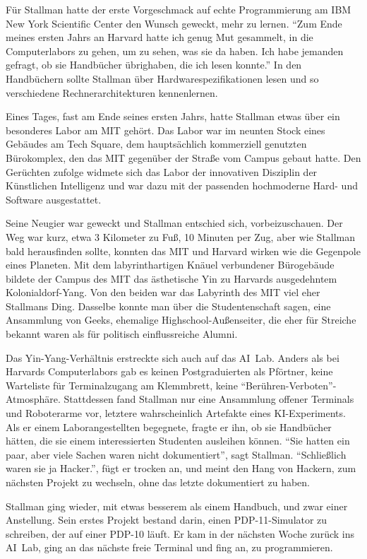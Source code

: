 Für Stallman hatte der erste Vorgeschmack auf echte Programmierung am IBM New York Scientific Center den Wunsch geweckt, mehr zu lernen. "`Zum Ende meines ersten Jahrs an Harvard hatte ich genug Mut gesammelt, in die Computerlabors zu gehen, um zu sehen, was sie da haben. Ich habe jemanden gefragt, ob sie Handbücher übrighaben, die ich lesen konnte."' In den Handbüchern sollte Stallman über Hardwarespezifikationen lesen und so verschiedene Rechnerarchitekturen kennenlernen.

Eines Tages, fast am Ende seines ersten Jahrs, hatte Stallman etwas über ein besonderes Labor am MIT gehört. Das Labor war im neunten Stock eines Gebäudes am Tech Square, dem hauptsächlich kommerziell genutzten Bürokomplex, den das MIT gegenüber der Straße vom Campus gebaut hatte. Den Gerüchten zufolge widmete sich das Labor der innovativen Disziplin der Künstlichen Intelligenz und war dazu mit der passenden hochmoderne Hard- und Software ausgestattet.

Seine Neugier war geweckt und Stallman entschied sich, vorbeizuschauen.
Der Weg war kurz, etwa 3 Kilometer zu Fuß, 10 Minuten per Zug, aber wie Stallman bald herausfinden sollte, konnten das MIT und Harvard wirken wie die Gegenpole eines Planeten. Mit dem labyrinthartigen Knäuel verbundener Bürogebäude bildete der Campus des MIT das ästhetische Yin zu Harvards ausgedehntem Kolonialdorf-Yang. Von den beiden war das Labyrinth des MIT viel eher Stallmans Ding. Dasselbe konnte man über die Studentenschaft sagen, eine Ansammlung von Geeks, ehemalige Highschool-Außenseiter, die eher für Streiche bekannt waren als für politisch einflussreiche Alumni.

Das Yin-Yang-Verhältnis erstreckte sich auch auf das AI~Lab. Anders als bei Harvards Computerlabors gab es keinen Postgraduierten als Pförtner, keine Warteliste für Terminalzugang am Klemmbrett, keine "`Berühren-Verboten"'-Atmosphäre. Stattdessen fand Stallman nur eine Ansammlung offener Terminals und Roboterarme vor, letztere wahrscheinlich Artefakte eines KI-Experiments. Als er einem Laborangestellten begegnete, fragte er ihn, ob sie Handbücher hätten, die sie einem interessierten Studenten ausleihen können. "`Sie hatten ein paar, aber viele Sachen waren nicht dokumentiert"', sagt Stallman. "`Schließlich waren sie ja Hacker."', fügt er trocken an, und meint den Hang von Hackern, zum nächsten Projekt zu wechseln, ohne das letzte dokumentiert zu haben.

Stallman ging wieder, mit etwas besserem als einem Handbuch, und zwar einer Anstellung. Sein erstes Projekt bestand darin, einen PDP-11-Simulator zu schreiben, der auf einer PDP-10 läuft. Er kam in der nächsten Woche zurück ins AI~Lab, ging an das nächste freie Terminal und fing an, zu programmieren.


